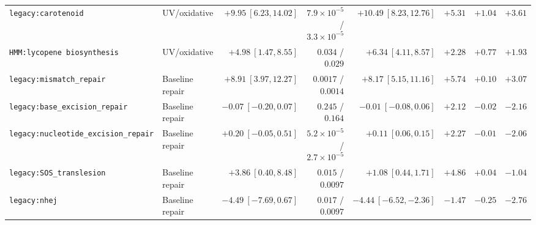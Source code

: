 \begin{table}[htbp]
\begin{tabular}{>{\raggedright\arraybackslash}p{2.9cm}lrrrrrr}
\texttt{legacy:carotenoid} & UV/oxidative & $+9.95\ [6.23,14.02]$ & $7.9\times 10^{-5}$ / $3.3\times 10^{-5}$ & $+10.49\ [8.23,12.76]$ & $+5.31$ & $+1.04$ & $+3.61$\\
\texttt{HMM:lycopene biosynthesis} & UV/oxidative & $+4.98\ [1.47,8.55]$ & $0.034$ / $0.029$ & $+6.34\ [4.11,8.57]$ & $+2.28$ & $+0.77$ & $+1.93$\\
\texttt{legacy:\allowbreak mismatch\_\allowbreak repair} & Baseline repair & $+8.91\ [3.97,12.27]$ & $0.0017$ / $0.0014$ & $+8.17\ [5.15,11.16]$ & $+5.74$ & $+0.10$ & $+3.07$\\
\texttt{legacy:\allowbreak base\_\allowbreak excision\_\allowbreak repair} & Baseline repair & $-0.07\ [-0.20,0.07]$ & $0.245$ / $0.164$ & $-0.01\ [-0.08,0.06]$ & $+2.12$ & $-0.02$ & $-2.16$\\
\texttt{legacy:\allowbreak nucleotide\_\allowbreak excision\_\allowbreak repair} & Baseline repair & $+0.20\ [-0.05,0.51]$ & $5.2\times 10^{-5}$ / $2.7\times 10^{-5}$ & $+0.11\ [0.06,0.15]$ & $+2.27$ & $-0.01$ & $-2.06$\\
\texttt{legacy:\allowbreak SOS\_\allowbreak translesion} & Baseline repair & $+3.86\ [0.40,8.48]$ & $0.015$ / $0.0097$ & $+1.08\ [0.44,1.71]$ & $+4.86$ & $+0.04$ & $-1.04$\\
\texttt{legacy:nhej} & Baseline repair & $-4.49\ [-7.69,0.67]$ & $0.017$ / $0.0097$ & $-4.44\ [-6.52,-2.36]$ & $-1.47$ & $-0.25$ & $-2.76$\\\bottomrule
\end{tabular}
\end{table}

